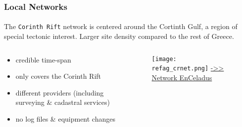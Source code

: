 \begin{frame}\frametitle{Local Networks}\framesubtitle{}
\vskip-1cm
  The \texttt{Corinth Rift} network is centered around the Cortinth Gulf, a 
  region of special tectonic interest. Larger site density compared to the 
  rest of Greece.
  \begin{columns}[T]
    \begin{column}{.4\textwidth}
      \begin{itemize}
        \item<pro@1-> credible time-span
        \item<pro@1-> only covers the Corinth Rift
        \item<con@1-> different providers (including surveying \& cadastral services)
        \item<con@1-> no log files \& equipment changes
      \end{itemize}
    \end{column}
    \begin{column}{.6\textwidth}
      \begin{figure}
      \begin{center}
        \texttt{[image: refag\_crnet.png]}
      \href{http://dionysos.survey.ntua.gr/dso/enceladus/}{->> Network EnCeladus}
     \label{fig:crlab}
     \end{center}
 \end{figure}
      
    \end{column}
  \end{columns}
 
%
%
%


\end{frame}


